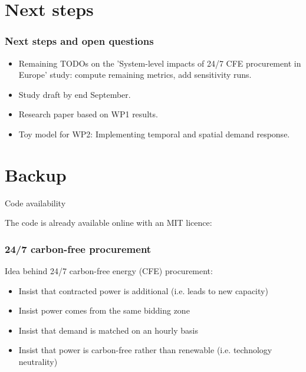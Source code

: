 \section{Next steps}

\begin{frame}
  \frametitle{Next steps and open questions}

\begin{itemize}
\item Remaining TODOs on the 'System-level impacts of 24/7 CFE
procurement in Europe' study: compute remaining metrics, add sensitivity runs.
\item Study draft by end September.
\item Research paper based on WP1 results.
\item Toy model for WP2: Implementing temporal and spatial demand response.
\end{itemize}


\end{frame}


\section*{Backup}

\begin{frame}{Code availability}

  The code is already available online with an MIT licence:


\end{frame}


\begin{frame}
  \frametitle{24/7 carbon-free procurement}

  Idea behind \alert{24/7 carbon-free energy (CFE)} procurement:

  \begin{itemize}
  \item Insist that contracted power is \alert{additional} (i.e. leads to new capacity)
  \item Insist power comes from the \alert{same bidding zone}
   \item Insist that demand is matched on an \alert{hourly basis}
    \item Insist that power is \alert{carbon-free} rather than renewable (i.e. technology neutrality)
  \end{itemize}

\end{frame}


